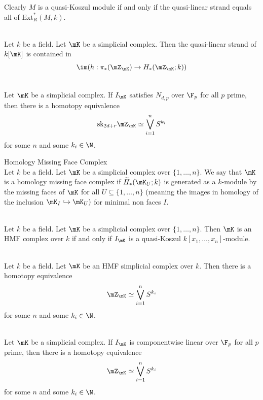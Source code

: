 \documentclass[a4paper]{article}
\begin{document}
Clearly $M$ is a quasi-Koszul module if and only if the quasi-linear strand equals all of $\text{Ext}_R^\ast(M,k)$. 

\begin{thm}{}{}\\
Let $k$ be a field. Let $\mK$ be a simplicial complex. Then the quasi-linear strand of $k[\mK]$ is contained in $$\im(h:\pi_\ast(\mZ_\mK)\to H_\ast(\mZ_\mK;k))$$
\end{thm}

\begin{crl}{}{}\\
Let $\mK$ be a simplicial complex. If $I_\mK$ satisfies $N_{d,p}$ over $\F_p$ for all $p$ prime, then there is a homotopy equivalence $$\text{sk}_{2d+r}\mZ_\mK\simeq\bigvee_{i=1}^nS^{k_i}$$ for some $n$ and some $k_i\in\N$. 
\end{crl}

\begin{defn}{Homology Missing Face Complex}{}\\
Let $k$ be a field. Let $\mK$ be a simplicial complex over $\{1,\dots,n\}$. We say that $\mK$ is a homology missing face complex if $\widetilde{H}_\ast(\mK_U;k)$ is generated as a $k$-module by the missing faces of $\mK$ for all $U\subseteq\{1,\dots,n\}$ (meaning the images in homology of the inclusion $\mK_I\hookrightarrow\mK_U)$ for minimal non faces $I$. 
\end{defn}

\begin{lmm}{}{}\\
Let $k$ be a field. Let $\mK$ be a simplicial complex over $\{1,\dots,n\}$. Then $\mK$ is an HMF complex over $k$ if and only if $I_\mK$ is a quasi-Koszul $k[x_1,\dots,x_n]$-module. 
\end{lmm}

\begin{crl}{}{}\\
Let $k$ be a field. Let $\mK$ be an HMF simplicial complex over $k$. Then there is a homotopy equivalence $$\mZ_\mK\simeq\bigvee_{i=1}^nS^{k_i}$$ for some $n$ and some $k_i\in\N$. 
\end{crl}

\begin{crl}{}{}\\
Let $\mK$ be a simplicial complex. If $I_\mK$ is componentwise linear over $\F_p$ for all $p$ prime, then there is a homotopy equivalence $$\mZ_\mK\simeq\bigvee_{i=1}^nS^{k_i}$$ for some $n$ and some $k_i\in\N$. 
\end{crl}
\end{document}
